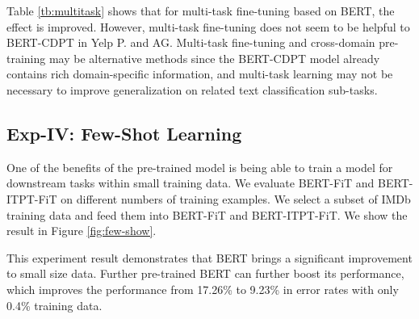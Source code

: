 \documentclass[11pt,a4paper]{article}
\theoremstyle{definition}
\begin{document}
\begin{CJK*}{UTF8}{gbsn}
Table \ref{tb:multitask} shows that for multi-task fine-tuning based on BERT, the effect is improved. However, multi-task fine-tuning does not seem to be helpful to BERT-CDPT in Yelp P. and AG. Multi-task fine-tuning and cross-domain pre-training may be alternative methods since the BERT-CDPT model already contains rich domain-specific information, and multi-task learning may not be necessary to improve generalization on related text classification sub-tasks.




\subsection{Exp-IV: Few-Shot Learning}\label{sec:exp-few}

One of the benefits of the pre-trained model is being able to train a model for downstream tasks within small training data. We evaluate BERT-FiT and BERT-ITPT-FiT on different numbers of training examples. We select a subset of IMDb training data and feed them into BERT-FiT and BERT-ITPT-FiT. We show the result in Figure \ref{fig:few-show}.

This experiment result demonstrates that BERT brings a significant improvement to small size data. Further pre-trained BERT can further boost its performance, which improves the performance from 17.26\% to 9.23\% in error rates with only 0.4\% training data.




\begin{figure}[h!]
    \centering
    \pgfplotsset{width=0.4\textwidth}
\end{figure}
\end{CJK*}
\end{document}
